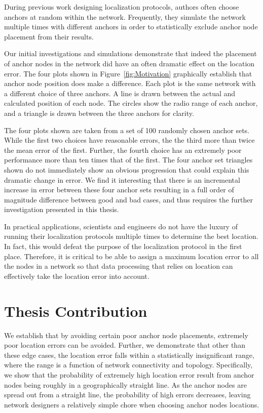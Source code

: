 During previous work designing localization protocols\cite[p. 11]{CCA-MAP09}\cite[p.2 ]{MDS-MAP}, authors often choose anchors at random within the network.  Frequently, they simulate the network multiple times with different anchors in order to statistically exclude anchor node placement from their results. 

Our initial investigations and simulations demonstrate that indeed the placement of anchor nodes in the network did have an often dramatic effect on the location error.  The four plots shown in Figure~\ref{fig:Motivation} graphically establish that anchor node position does make a difference.  Each plot is the same network with a different choice of three anchors.  A line is drawn between the actual and calculated position of each node.  The circles show the radio range of each anchor, and a triangle is drawn between the three anchors for clarity.  

The four plots shown are taken from a set of 100 randomly chosen anchor sets.  While the first two choices have reasonable errors, the the third more than twice the mean error of the first.  Further, the fourth choice has an extremely poor performance more than ten times that of the first.  The four anchor set triangles shown do not immediately show an obvious progression that could explain this dramatic change in error. We find it interesting that there is an incremental increase in error between these four anchor sets resulting in a full order of magnitude difference between good and bad cases, and thus requires the further investigation presented in this thesis.

In practical applications, scientists and engineers do not have the luxury of running their localization protocols multiple times to determine the best location.  In fact, this would defeat the purpose of the localization protocol in the first place.  Therefore, it is critical to be able to assign a maximum location error to all the nodes in a network so that data processing that relies on location can effectively take the location error into account.  

\section{Thesis Contribution}
We establish that by avoiding certain poor anchor node placements, extremely poor location errors can be avoided.  Further, we demonstrate that other than these edge cases, the location error falls within a statistically insignificant range, where the range is a function of network connectivity and topology.  Specifically, we show that the probability of extremely high location error result from anchor nodes being roughly in a geographically straight line.  As the anchor nodes are spread out from a straight line, the probability of high errors decreases, leaving network designers a relatively simple chore when choosing anchor nodes locations.

